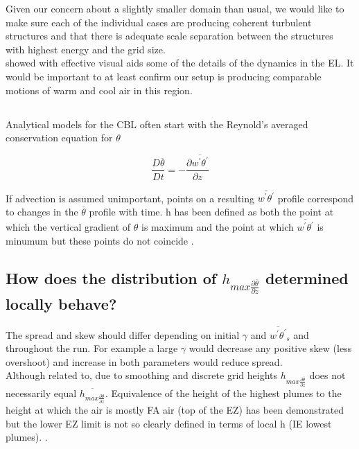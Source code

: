 Given our concern about a slightly smaller domain than usual, we would like to make sure each of the individual cases are producing coherent turbulent structures and that there is adequate scale separation between the structures with highest energy and the grid size.\\

\citeauthor{SullMoengStev} \cite{SullMoengStev} showed with effective visual aids some of the details of the dynamics in the \acs{EL}.  It would be important to at least confirm our setup is producing comparable motions of warm and cool air in this region.


  

\subsection{}

Analytical models for the CBL often start with the Reynold's averaged conservation equation for $\theta$ \cite{Deardorff79}

\begin{equation}
\frac{D \overline{\theta}}{Dt} = -\frac{\partial \overline{w^{'} \theta^{'}}}{\partial z}
\end{equation}

If advection is assumed unimportant, points on a resulting $\overline{w^{'} \theta^{'}}$ profile correspond to changes in the $\overline{\theta}$ profile with time.  h has been defined as both the point at which the vertical gradient of $\theta$ is maximum and the point at which $\overline{w^{'} \theta^{'}}$ is minumum but these points do not coincide \cite{SullMoengStev}.

\subsection{How does the distribution of $h_{max \frac{\partial \overline{\theta}}{\partial z}}$ determined locally behave?}
The spread and skew should differ depending on initial $\gamma$ and $\overline{w^{'}\theta^{'}}_{s}$ 
and throughout the run.  For example a large $\gamma$ would decrease any positive skew (less overshoot) 
and increase in both parameters would reduce spread.\\

Although related to, due to smoothing and discrete grid heights $h_{max \frac{\partial \overline{\theta}}{\partial z}}$ does not necessarily equal 
$\overline{h_{max \frac{\partial {\theta}}{\partial z}}}$. Equivalence of the height of the highest plumes to the height at which the air is mostly FA air (top of the EZ) has been demonstrated but the lower EZ limit is not so clearly defined in terms of local h (IE lowest plumes).%
\cite{BrooksFowler2}. 

